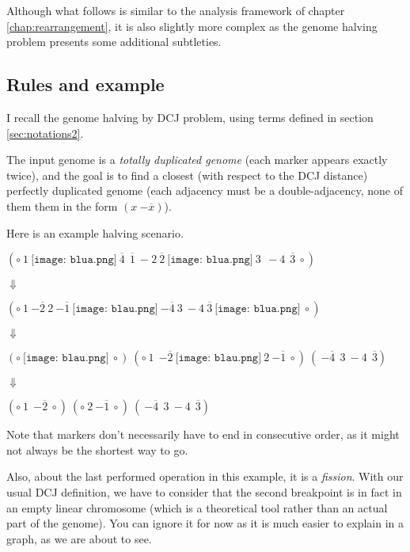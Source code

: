 \documentclass[11pt,final,twoside,nofrench]{thlifl}
\newcommand{\snd}[1]{ \ensuremath{\overline{#1}} }
\newcommand{\msnd}[1]{ \ensuremath{{-\overline{#1}}} }
\begin{document}
Although what follows is similar to the analysis framework of chapter \ref{chap:rearrangement}, it is also slightly more complex as the genome halving problem presents some additional subtleties.

\subsection{Rules and example}

I recall the genome halving by DCJ problem, using terms defined in section \ref{sec:notations2}.

The input genome is a \emph{totally duplicated genome} (each marker appears exactly twice), and the goal is to find a closest (with respect to the DCJ distance) perfectly duplicated genome (each adjacency must be a double-adjacency, none of them them in the form $(x~\msnd{x})$).

Here is an example halving scenario.

\begin{center}

$(\circ~1~\texttt{[image: blua.png]}~\snd{4}~~\snd{1}~-2~\snd{2}~\texttt{[image: blua.png]}~3~~-4~~\snd{3}~\circ)$

$\Downarrow$

$ (\circ~1~\msnd{2}~2~\msnd{1}~\texttt{[image: blau.png]}~\msnd{4}~3~-4~\snd{3}~\texttt{[image: blua.png]}~\circ)$

$\Downarrow$

$(\circ~\texttt{[image: blau.png]}~\circ)~(\circ~1~~\msnd{2}~\texttt{[image: blau.png]}~2~\msnd{1}~\circ)~(~\msnd{4}~~3~-4~~\snd{3})$

$\Downarrow$

$(\circ~1~~\msnd{2}~\circ)~(\circ~2~\msnd{1}~\circ)~(~\msnd{4}~~3~-4~~\snd{3})$

\end{center}

Note that markers don't necessarily have to end in consecutive order, as it might not always be the shortest way to go.

Also, about the last performed operation in this example, it is a \emph{fission}. With our usual DCJ definition, we have to consider that the second breakpoint is in fact in an empty linear chromosome (which is a theoretical tool rather than an actual part of the genome). You can ignore it for now as it is much easier to explain in a graph, as we are about to see.
\end{document}
